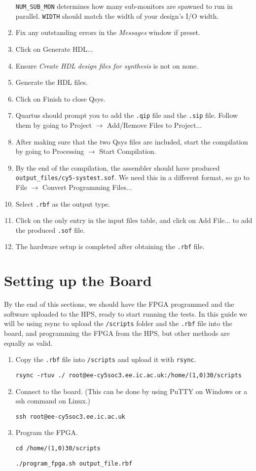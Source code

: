 \begin{enumerate}
        \texttt{NUM\_SUB\_MON} determines how many sub-monitors are spawned to run in parallel.
        \texttt{WIDTH} should match the width of your design's I/O width.
  \item Fix any outstanding errors in the \textit{Messages} window if preset.
  \item Click on Generate HDL...
  \item Ensure \textit{Create HDL design files for synthesis} is not on none.
  \item Generate the HDL files.
  \item Click on Finish to close Qsys.
  \item Quartus should prompt you to add the \texttt{.qip} file and the \texttt{.sip} file.
        Follow them by going to Project $\rightarrow$ Add/Remove Files to Project...
  \item After making sure that the two Qsys files are included, start the compilation by going to Processing $\rightarrow$ Start Compilation.
  \item By the end of the compilation, the assembler should have produced \texttt{output\_files/cy5-systest.sof}.
        We need this in a different format, so go to File $\rightarrow$ Convert Programming Files...
  \item Select \texttt{.rbf} as the output type.
  \item Click on the only entry in the input files table, and click on Add File... to add the produced \texttt{.sof} file.
  \item The hardware setup is completed after obtaining the \texttt{.rbf} file.
\end{enumerate}

\section{Setting up the Board}
By the end of this sections, we should have the FPGA programmed and the software uploaded to the HPS, ready to start running the tests.
In this guide we will be using rsync to upload the \texttt{/scripts} folder and the \texttt{.rbf} file into the board, and programming the FPGA from the HPS, but other methods are equally as valid.

\begin{enumerate}
  \item Copy the \texttt{.rbf} file into \texttt{/scripts} and upload it with \texttt{rsync}.

  \texttt{rsync -rtuv ./ root@ee-cy5soc3.ee.ic.ac.uk:/home/\line(1,0){30}/scripts}
  \item Connect to the board.
        (This can be done by using PuTTY on Windows or a ssh command on Linux.)

  \texttt{ssh root@ee-cy5soc3.ee.ic.ac.uk}
  \item Program the FPGA.

  \texttt{cd /home/\line(1,0){30}/scripts}

  \texttt{./program\_fpga.sh output\_file.rbf}
\end{enumerate}


